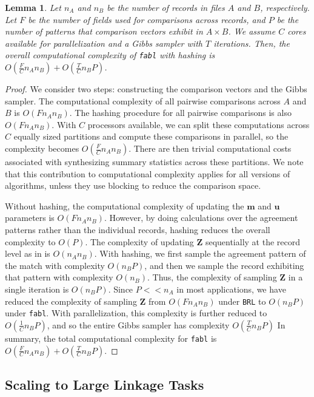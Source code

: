 \documentclass[ba]{imsart}
\newtheorem{lemma}{Lemma}
\begin{document}
\begin{lemma}
	Let $n_A$ and $n_B$ be the number of records in files $A$ and $B$, respectively. Let $F$ be the number of fields used for comparisons across records, and $P$ be the number of patterns that comparison vectors exhibit in $A \times B$. We assume $C$ cores available for parallelization and a Gibbs sampler with $T$ iterations. Then, the overall computational complexity of \texttt{fabl} with hashing is $O(\frac{F}{C} n_A n_B) + O(\frac{T}{C}n_B P)$.
	\label{lemma:fabl}
\end{lemma}
\begin{proof}
	We consider two steps: constructing the comparison vectors and the Gibbs sampler. The computational complexity of all pairwise comparisons across $A$ and $B$ is $O(F n_A n_B)$. The hashing procedure for all pairwise comparisons is also $O(F n_A n_B)$. With $C$ processors available, we can split these computations across $C$ equally sized partitions and compute these comparisons in parallel, so the complexity becomes $O(\frac{F}{C} n_A n_B)$. There are then trivial computational costs associated with synthesizing summary statistics across these partitions. We note that this contribution to computational complexity applies for all versions of \cite{fellegi_theory_1969} algorithms, unless they use blocking to reduce the comparison space.
	
	Without hashing, the computational complexity of updating the $\bm{m}$ and $\bm{u}$ parameters is $O(F n_A n_B)$. However, by doing calculations over the agreement patterns rather than the individual records, hashing reduces the overall complexity to $O(P)$. The complexity of updating $\bm{Z}$ sequentially at the record level as in \cite{sadinle_bayesian_2017} is $O(n_A n_B)$. With hashing, we first sample the agreement pattern of the match with complexity $O(n_B P)$, and then we sample the record exhibiting that pattern with complexity $O(n_B)$. Thus, the complexity of sampling $\bm{Z}$ in a single iteration is $O(n_B P)$. Since $P << n_A$ in most applications, we have reduced the complexity of sampling $\bm{Z}$ from $O(F n_A n_B)$ under \texttt{BRL} to $O(n_B P)$ under \texttt{fabl}. With parallelization, this complexity is further reduced to $O(\frac{1}{C}n_B P)$, and so the entire Gibbs sampler has complexity $O(\frac{T}{C}n_B P)$
	In summary, the total computational complexity for \texttt{fabl} is $O(\frac{F}{C} n_A n_B) + O(\frac{T}{C}n_B P).$
\end{proof} 

\hypertarget{scaling}{%
	\subsection{Scaling to Large Linkage Tasks}\label{scaling}}
\end{document}
